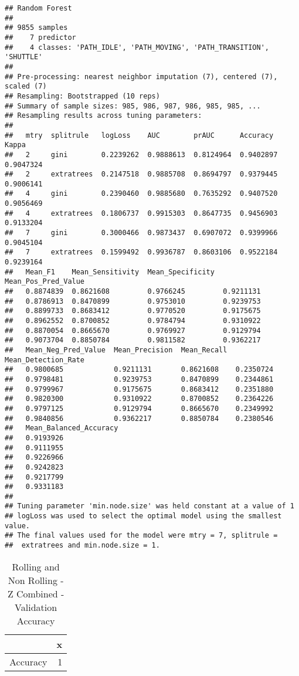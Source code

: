 \documentclass[]{article}
\begin{document}
\begin{verbatim}
## Random Forest 
## 
## 9855 samples
##    7 predictor
##    4 classes: 'PATH_IDLE', 'PATH_MOVING', 'PATH_TRANSITION', 'SHUTTLE' 
## 
## Pre-processing: nearest neighbor imputation (7), centered (7), scaled (7) 
## Resampling: Bootstrapped (10 reps) 
## Summary of sample sizes: 985, 986, 987, 986, 985, 985, ... 
## Resampling results across tuning parameters:
## 
##   mtry  splitrule   logLoss    AUC        prAUC      Accuracy   Kappa    
##   2     gini        0.2239262  0.9888613  0.8124964  0.9402897  0.9047324
##   2     extratrees  0.2147518  0.9885708  0.8694797  0.9379445  0.9006141
##   4     gini        0.2390460  0.9885680  0.7635292  0.9407520  0.9056469
##   4     extratrees  0.1806737  0.9915303  0.8647735  0.9456903  0.9133204
##   7     gini        0.3000466  0.9873437  0.6907072  0.9399966  0.9045104
##   7     extratrees  0.1599492  0.9936787  0.8603106  0.9522184  0.9239164
##   Mean_F1    Mean_Sensitivity  Mean_Specificity  Mean_Pos_Pred_Value
##   0.8874839  0.8621608         0.9766245         0.9211131          
##   0.8786913  0.8470899         0.9753010         0.9239753          
##   0.8899733  0.8683412         0.9770520         0.9175675          
##   0.8962552  0.8700852         0.9784794         0.9310922          
##   0.8870054  0.8665670         0.9769927         0.9129794          
##   0.9073704  0.8850784         0.9811582         0.9362217          
##   Mean_Neg_Pred_Value  Mean_Precision  Mean_Recall  Mean_Detection_Rate
##   0.9800685            0.9211131       0.8621608    0.2350724          
##   0.9798481            0.9239753       0.8470899    0.2344861          
##   0.9799967            0.9175675       0.8683412    0.2351880          
##   0.9820300            0.9310922       0.8700852    0.2364226          
##   0.9797125            0.9129794       0.8665670    0.2349992          
##   0.9840856            0.9362217       0.8850784    0.2380546          
##   Mean_Balanced_Accuracy
##   0.9193926             
##   0.9111955             
##   0.9226966             
##   0.9242823             
##   0.9217799             
##   0.9331183             
## 
## Tuning parameter 'min.node.size' was held constant at a value of 1
## logLoss was used to select the optimal model using the smallest value.
## The final values used for the model were mtry = 7, splitrule =
##  extratrees and min.node.size = 1.
\end{verbatim}

\begin{table}[!h]

\caption{\label{tab:sensor-z-combined-rolling-rf-results}Rolling and Non Rolling - Z Combined - Validation Accuracy}
\centering
\begin{tabular}[t]{lr}
\toprule
  & x\\
\midrule
Accuracy & 1\\
\bottomrule
\end{tabular}
\end{table}
\end{document}
